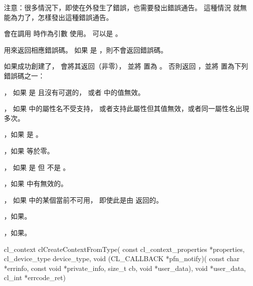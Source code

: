 注意：很多情況下，即使在外發生了錯誤，也需要發出錯誤通告。
這種情況  就無能為力了，怎樣發出這種錯誤通告。

 會在調用  時作為引數  使用。
 可以是 。

 用來返回相應錯誤碼。
如果  是 ，則不會返回錯誤碼。

如果成功創建了， 會將其返回（非零），
並將  置為 。
否則返回 ，並將  置為下列錯誤碼之一：
\startigBase
\item {}，
如果  是  且沒有可選的，
或者  中的值無效。

\item {}，
如果  中的屬性名不受支持，
或者支持此屬性但其值無效，或者同一屬性名出現多次。

\item {}，如果  是 。

\item {}，如果  等於零。

\item {}，
如果  是  但  不是 。

\item {}，如果  中有無效的。

\item {}，
如果  中的某個當前不可用，
即使此是由  返回的。

\item {}，如果\scdevfailres。

\item {}，如果\schostfailres。
\stopigBase


\startCLFUNC
cl_context clCreateContextFromType(
		const cl_context_properties *properties,
		cl_device_type device_type,
		void (CL_CALLBACK *pfn_notify)(
			const char *errinfo,
			const void *private_info,
			size_t cb,
			void *user_data),
		void *user_data,
		cl_int *errcode_ret)
\stopCLFUNC

